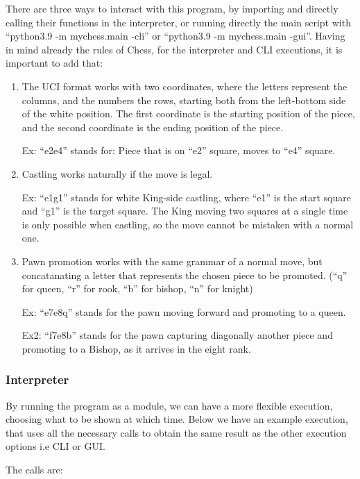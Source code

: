 \documentclass[10pt]{article}
\begin{document}
There are three ways to interact with this program, by importing and directly
calling their functions in the interpreter, or running directly the main script
with ``python3.9 -m mychess.main -cli'' or ``python3.9 -m mychess.main -gui''.
Having in mind already the rules of Chess, for the interpreter and CLI
executions, it is important to add that:
\begin{enumerate}[label=\alph*)]
\item The UCI format works with two coordinates, where the letters represent the
    columns, and the numbers the rows, starting both from the left-bottom side
    of the white position. The first coordinate is the starting position of the
    piece, and the second coordinate is the ending position of the piece.

    Ex: ``e2e4'' stands for: Piece that is on ``e2'' square, moves to ``e4''
    square.
\item Castling works naturally if the move is legal. 

    Ex: ``e1g1'' stands for white King-side castling, where ``e1'' is the start square and
    ``g1'' is the target square. The King moving two squares at a single time is
    only possible when castling, so the move cannot be mistaken with a normal
    one. 
\item Pawn promotion works with the same grammar of a normal move, but
    concatanating a letter that represents the chosen piece to be promoted.
    (``q'' for queen, ``r'' for rook, ``b'' for bishop, ``n'' for knight)

    Ex: ``e7e8q'' stands for the pawn moving forward and promoting to a queen.

    Ex2: ``f7e8b'' stands for the pawn capturing diagonally another piece and
    promoting to a Bishop, as it arrives in the eight rank.

\end{enumerate}



\subsubsection{Interpreter}

By running the program as a module, we can have a more flexible execution,
choosing what to be shown at which time. Below we have an example execution,
that uses all the necessary calls to obtain the same result as the other
execution options i.e CLI or GUI.

The calls are:
\end{document}

